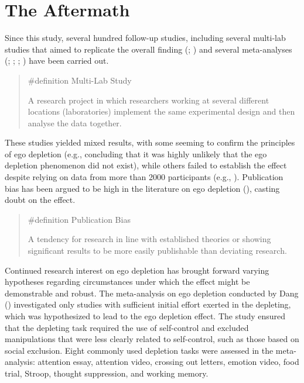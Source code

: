 \documentclass[
  letterpaper,
]{book}
\begin{document}
\section{The Aftermath}\label{the-aftermath-4}

Since this study, several hundred follow-up studies, including several
multi-lab studies that aimed to replicate the overall finding
(;
) and several meta-analyses
(;
;
; ) have been carried out.

\begin{quote}
\label{def-multilabstudy}{\#definition} Multi-Lab Study

A research project in which researchers working at several different
locations (laboratories) implement the same experimental design and then
analyse the data together.
\end{quote}

These studies yielded mixed results, with some seeming to confirm the
principles of ego depletion (e.g.,  concluding that it was highly unlikely that the ego depletion
phenomenon did not exist), while others failed to establish the effect
despite relying on data from more than 2000 participants (e.g.,
). Publication
bias has been argued to be high in the literature on ego depletion
(), casting doubt on
the effect.

\begin{quote}
{\#definition} Publication Bias

A tendency for research in line with established theories or showing
significant results to be more easily publishable than deviating
research.
\end{quote}

Continued research interest on ego depletion has brought forward varying
hypotheses regarding circumstances under which the effect might be
demonstrable and robust. The meta-analysis on ego depletion conducted by
Dang () investigated only studies with
sufficient initial effort exerted in the depleting, which was
hypothesized to lead to the ego depletion effect. The study ensured that
the depleting task required the use of self-control and excluded
manipulations that were less clearly related to self-control, such as
those based on social exclusion. Eight commonly used depletion tasks
were assessed in the meta-analysis: attention essay, attention video,
crossing out letters, emotion video, food trial, Stroop, thought
suppression, and working memory.
\end{document}
